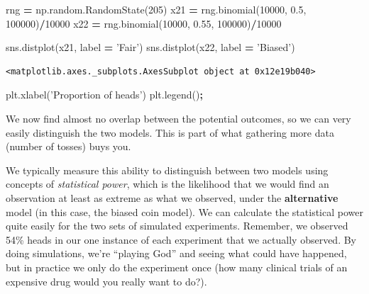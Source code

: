 \documentclass[
  letterpaper,
]{scrbook}
\newenvironment{Shaded}{\begin{snugshade}}{\end{snugshade}}
\newcommand{\DecValTok}[1]{\textcolor[rgb]{0.00,0.00,0.81}{#1}}
\newcommand{\FloatTok}[1]{\textcolor[rgb]{0.00,0.00,0.81}{#1}}
\newcommand{\NormalTok}[1]{#1}
\newcommand{\OperatorTok}[1]{\textcolor[rgb]{0.81,0.36,0.00}{\textbf{#1}}}
\newcommand{\StringTok}[1]{\textcolor[rgb]{0.31,0.60,0.02}{#1}}
\begin{document}
\begin{Shaded}
\begin{Highlighting}[]
\NormalTok{rng }\OperatorTok{=}\NormalTok{ np.random.RandomState(}\DecValTok{205}\NormalTok{)}
\NormalTok{x21 }\OperatorTok{=}\NormalTok{ rng.binomial(}\DecValTok{10000}\NormalTok{, }\FloatTok{0.5}\NormalTok{, }\DecValTok{100000}\NormalTok{)}\OperatorTok{/}\DecValTok{10000}
\NormalTok{x22 }\OperatorTok{=}\NormalTok{ rng.binomial(}\DecValTok{10000}\NormalTok{, }\FloatTok{0.55}\NormalTok{, }\DecValTok{100000}\NormalTok{)}\OperatorTok{/}\DecValTok{10000}

\NormalTok{sns.distplot(x21, label }\OperatorTok{=} \StringTok{'Fair'}\NormalTok{)}
\NormalTok{sns.distplot(x22, label }\OperatorTok{=} \StringTok{'Biased'}\NormalTok{)}
\end{Highlighting}
\end{Shaded}

\begin{verbatim}
<matplotlib.axes._subplots.AxesSubplot object at 0x12e19b040>
\end{verbatim}

\begin{Shaded}
\begin{Highlighting}[]
\NormalTok{plt.xlabel(}\StringTok{'Proportion of heads'}\NormalTok{)}
\NormalTok{plt.legend()}\OperatorTok{;}
\end{Highlighting}
\end{Shaded}

We now find almost no overlap between the potential outcomes, so we can very easily distinguish the two models. This is part of what gathering more data (number of tosses) buys you.

We typically measure this ability to distinguish between two models using concepts of \emph{statistical power}, which is the likelihood that we would find an observation at least as extreme as what we observed, under the \textbf{alternative} model (in this case, the biased coin model). We can calculate the statistical power quite easily for the two sets of simulated experiments. Remember, we observed 54\% heads in our one instance of each experiment that we actually observed. By doing simulations, we're ``playing God'' and seeing what could have happened, but in practice we only do the experiment once (how many clinical trials of an expensive drug would you really want to do?).
\end{document}
